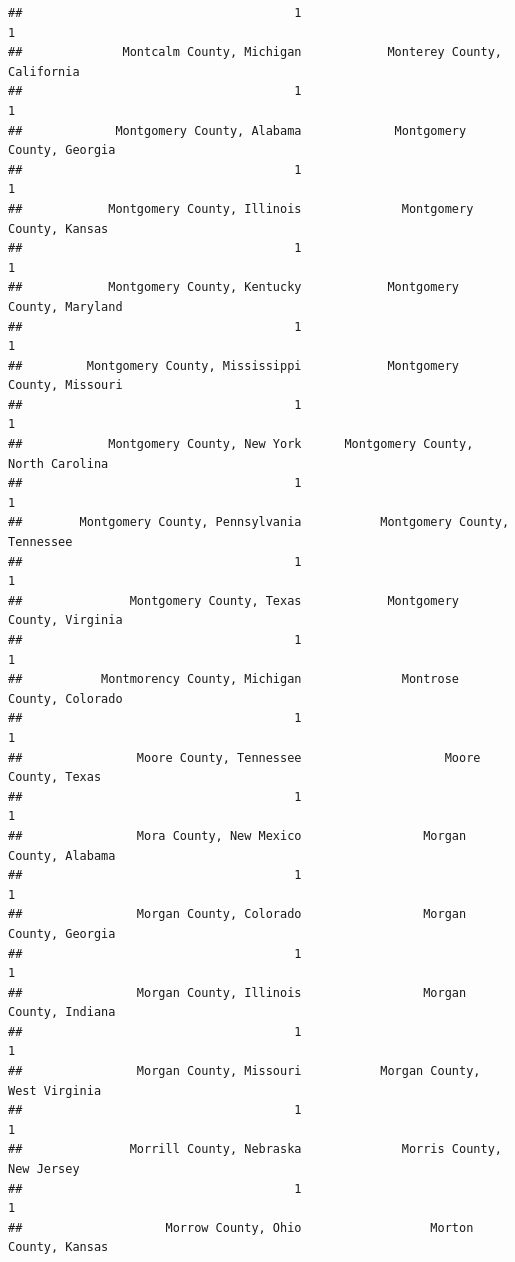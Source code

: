 \documentclass[
]{article}
\begin{document}
\begin{verbatim}
##                                      1                                      1 
##              Montcalm County, Michigan            Monterey County, California 
##                                      1                                      1 
##             Montgomery County, Alabama             Montgomery County, Georgia 
##                                      1                                      1 
##            Montgomery County, Illinois              Montgomery County, Kansas 
##                                      1                                      1 
##            Montgomery County, Kentucky            Montgomery County, Maryland 
##                                      1                                      1 
##         Montgomery County, Mississippi            Montgomery County, Missouri 
##                                      1                                      1 
##            Montgomery County, New York      Montgomery County, North Carolina 
##                                      1                                      1 
##        Montgomery County, Pennsylvania           Montgomery County, Tennessee 
##                                      1                                      1 
##               Montgomery County, Texas            Montgomery County, Virginia 
##                                      1                                      1 
##           Montmorency County, Michigan              Montrose County, Colorado 
##                                      1                                      1 
##                Moore County, Tennessee                    Moore County, Texas 
##                                      1                                      1 
##                Mora County, New Mexico                 Morgan County, Alabama 
##                                      1                                      1 
##                Morgan County, Colorado                 Morgan County, Georgia 
##                                      1                                      1 
##                Morgan County, Illinois                 Morgan County, Indiana 
##                                      1                                      1 
##                Morgan County, Missouri           Morgan County, West Virginia 
##                                      1                                      1 
##               Morrill County, Nebraska              Morris County, New Jersey 
##                                      1                                      1 
##                    Morrow County, Ohio                  Morton County, Kansas 

\end{verbatim}
\end{document}
